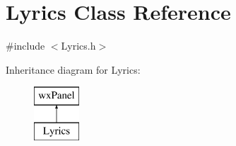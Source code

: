 \hypertarget{class_lyrics}{}\section{Lyrics Class Reference}
\label{class_lyrics}


{\ttfamily \#include $<$Lyrics.\+h$>$}

Inheritance diagram for Lyrics\+:\begin{figure}[H]
\begin{center}
\leavevmode
\includegraphics[height=2.000000cm]{class_lyrics}
\end{center}
\end{figure}
